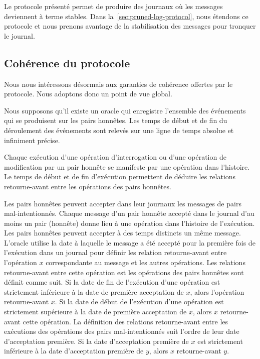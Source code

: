 Le protocole présenté permet de produire des journaux où les messages deviennent à terme stables.
Dans la~\autoref{sec:pruned-log-protocol}, nous étendons ce protocole et nous prenons avantage de la stabilisation des messages pour tronquer le journal.


\subsection{Cohérence du protocole}

Nous nous intéressons désormais aux garanties de cohérence offertes par le protocole.
Nous adoptons donc un point de vue global.

Nous supposons qu'il existe un oracle qui enregistre l'ensemble des événements qui se produisent sur les pairs honnêtes.
Les temps de début et de fin du déroulement des événements sont relevés sur une ligne de temps absolue et infiniment précise.

Chaque exécution d'une opération d'interrogation ou d'une opération de modification par un pair honnête se manifeste par une opération dans l'histoire.
Le temps de début et de fin d'exécution permettent de déduire les relations retourne-avant entre les opérations des pairs honnêtes.

Les pairs honnêtes peuvent accepter dans leur journaux les messages de pairs mal-intentionnés.
Chaque message d'un pair honnête accepté dans le journal d'au moins un pair (honnête) donne lieu à une opération dans l'histoire de l'exécution.
Les pairs honnêtes peuvent accepter à des temps distincts un même message.
L'oracle utilise la date à laquelle le message a été accepté pour la première fois de l'exécution dans un journal pour définir les relation retourne-avant entre l'opération $x$ correspondante au message et les autres opérations.
Les relations retourne-avant entre cette opération est les opérations des pairs honnêtes sont définit comme suit.
Si la date de fin de l'exécution d'une opération est strictement inférieure à la date de première acceptation de $x$, alors l'opération retourne-avant $x$.
Si la date de début de l'exécution d'une opération est strictement supérieure à la date de première acceptation de $x$, alors $x$ retourne-avant cette opération.
La définition des relations retourne-avant entre les exécutions des opérations des pairs mal-intentionnés suit l'ordre de leur date d'acceptation première.
Si la date d'acceptation première de $x$ est strictement inférieure à la date d'acceptation première de $y$, alors $x$ retourne-avant $y$.

